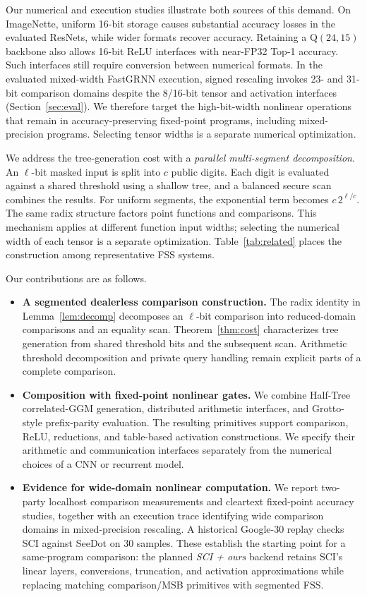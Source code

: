 \documentclass[journal]{IEEEtran}
\theoremstyle{definition}
\theoremstyle{plain}
\newcommand{\nseg}{c}                              %
\begin{document}
Our numerical and execution studies illustrate both sources of this demand.
On ImageNette, uniform 16-bit storage causes substantial accuracy losses in the
evaluated ResNets, while wider formats recover accuracy. Retaining a Q$(24,15)$
backbone also allows 16-bit ReLU interfaces with near-FP32 Top-1 accuracy.
Such interfaces still require conversion between numerical formats. In the
evaluated mixed-width FastGRNN execution, signed rescaling invokes 23- and
31-bit comparison domains despite the 8/16-bit tensor and activation interfaces
(Section~\ref{sec:eval}). We therefore target the high-bit-width nonlinear
operations that remain in accuracy-preserving fixed-point programs, including
mixed-precision programs. Selecting tensor widths is a separate numerical
optimization.

We address the tree-generation cost with a \emph{parallel multi-segment
decomposition}. An $\ell$-bit masked input is split into $\nseg$ public digits.
Each digit is evaluated against a shared threshold using a shallow tree, and a
balanced secure scan combines the results. For uniform segments, the exponential
term becomes $\nseg\,2^{\ell/\nseg}$. The same radix structure factors point
functions and comparisons. This mechanism applies at different function input
widths; selecting the numerical width of each tensor is a separate optimization.
Table~\ref{tab:related} places the construction among representative FSS systems.

Our contributions are as follows.
\begin{itemize}
  \item \textbf{A segmented dealerless comparison construction.}
  The radix identity in Lemma~\ref{lem:decomp} decomposes an $\ell$-bit
  comparison into reduced-domain comparisons and an equality scan.
  Theorem~\ref{thm:cost} characterizes tree generation from shared threshold
  bits and the subsequent scan. Arithmetic threshold decomposition and private
  query handling remain explicit parts of a complete comparison.

  \item \textbf{Composition with fixed-point nonlinear gates.}
  We combine Half-Tree correlated-GGM generation, distributed arithmetic
  interfaces, and Grotto-style prefix-parity evaluation. The resulting
  primitives support comparison, ReLU, reductions, and table-based activation
  constructions. We specify their arithmetic and communication interfaces
  separately from the numerical choices of a CNN or recurrent model.

  \item \textbf{Evidence for wide-domain nonlinear computation.}
  We report two-party localhost comparison measurements and cleartext
  fixed-point accuracy studies, together with an execution trace identifying
  wide comparison domains in mixed-precision rescaling. A historical Google-30
  replay checks SCI against SeeDot on 30 samples. These establish the starting
  point for a same-program comparison: the planned \emph{SCI + ours} backend retains
  SCI's linear layers, conversions, truncation, and activation approximations
  while replacing matching comparison/MSB primitives with segmented FSS.
\end{itemize}
\end{document}
